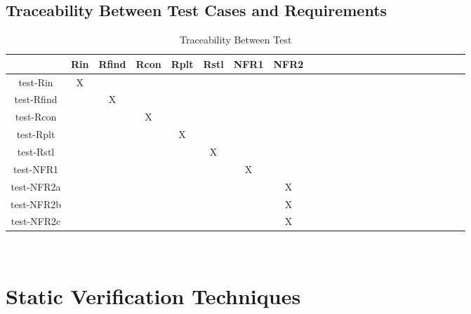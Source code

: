 \documentclass[12pt, titlepage]{article}
\begin{document}
\newpage
\subsection{Traceability Between Test Cases and Requirements}

\begin{table}[h]
	\centering
	\begin{tabular}{|c|c|c|c|c|c|c|c|c|c|c|c|c|c|c|c|c|c|c|c|c|c|c|c|}
		\hline        
		& Rin& Rfind & Rcon & Rplt & Rstl & NFR1 & NFR2 \\
		\hline
		test-Rin     &X & & & & & &  \\ \hline
		test-Rfind    & &X & & & & &  \\ \hline
		test-Rcon    & & &X & & & & \\ \hline 
		test-Rplt    & & & &X & & &   \\ \hline 
		test-Rstl    & & & & &X & &   \\ \hline 
		test-NFR1    & & & & & &X &   \\ \hline 
		test-NFR2a  & & & & & & &X   \\ \hline 
		test-NFR2b  & & & & & & &X   \\ \hline 
		test-NFR2c  & & & & & & &X \\
		\hline
	\end{tabular}\\
	\caption{Traceability Between Test }
	\label{Table:D_1}
\end{table} 


\section{Static Verification Techniques}
\end{document}
